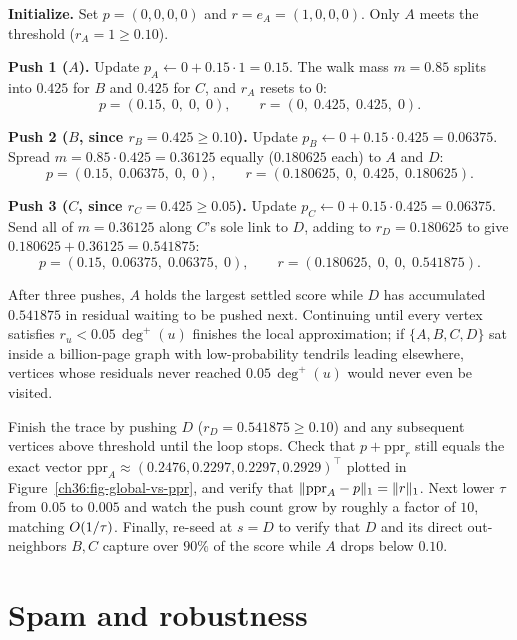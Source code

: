 \textbf{Initialize.} Set $p = (0,0,0,0)$ and $r = e_A = (1,0,0,0)$. Only $A$ meets the threshold ($r_A = 1 \ge 0.10$).

\textbf{Push 1 ($A$).} Update $p_A \gets 0 + 0.15 \cdot 1 = 0.15$. The walk mass $m = 0.85$ splits into $0.425$ for $B$ and $0.425$ for $C$, and $r_A$ resets to $0$:
\[
  p = (0.15,\; 0,\; 0,\; 0), \qquad r = (0,\; 0.425,\; 0.425,\; 0).
\]

\textbf{Push 2 ($B$, since $r_B = 0.425 \ge 0.10$).} Update $p_B \gets 0 + 0.15 \cdot 0.425 = 0.06375$. Spread $m = 0.85 \cdot 0.425 = 0.36125$ equally ($0.180625$ each) to $A$ and $D$:
\[
  p = (0.15,\; 0.06375,\; 0,\; 0), \qquad r = (0.180625,\; 0,\; 0.425,\; 0.180625).
\]

\textbf{Push 3 ($C$, since $r_C = 0.425 \ge 0.05$).} Update $p_C \gets 0 + 0.15 \cdot 0.425 = 0.06375$. Send all of $m = 0.36125$ along $C$'s sole link to $D$, adding to $r_D = 0.180625$ to give $0.180625 + 0.36125 = 0.541875$:
\[
  p = (0.15,\; 0.06375,\; 0.06375,\; 0), \qquad r = (0.180625,\; 0,\; 0,\; 0.541875).
\]

After three pushes, $A$ holds the largest settled score while $D$ has accumulated $0.541875$ in residual waiting to be pushed next. Continuing until every vertex satisfies $r_u < 0.05\,\deg^+(u)$ finishes the local approximation; if $\{A,B,C,D\}$ sat inside a billion-page graph with low-probability tendrils leading elsewhere, vertices whose residuals never reached $0.05\,\deg^+(u)$ would never even be visited.

\begin{labbox}
Finish the trace by pushing $D$ ($r_D = 0.541875 \ge 0.10$) and any subsequent vertices above threshold until the loop stops. Check that $p + \mathrm{ppr}_r$ still equals the exact vector $\mathrm{ppr}_A \approx (0.2476, 0.2297, 0.2297, 0.2929)^\top$ plotted in Figure~\ref{ch36:fig-global-vs-ppr}, and verify that $\lVert\mathrm{ppr}_A - p\rVert_1 = \lVert r\rVert_1$. Next lower $\tau$ from $0.05$ to $0.005$ and watch the push count grow by roughly a factor of $10$, matching $O(1/\tau)$. Finally, re-seed at $s = D$ to verify that $D$ and its direct out-neighbors $B, C$ capture over $90\%$ of the score while $A$ drops below $0.10$.
\end{labbox}

\section{Spam and robustness}
\label{ch36:spam}

